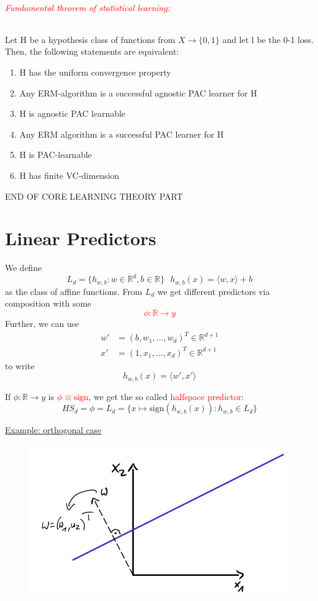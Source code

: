 \documentclass[10pt,a4paper]{article}
\theoremstyle{definition}
\theoremstyle{plain}
\begin{document}
\paragraph{\textcolor{red}{Fundamental theorem of statistical learning:}}
Let H be a hypothesis class of functions from $X \to \{ 0,1 \}$ and let l be the 0-1 loss. Then, the following statements are equivalent:
\begin{enumerate}
	\item H has the uniform convergence property
	\item Any ERM-algorithm is a successful agnostic PAC learner for H
	\item H is agnostic PAC learnable
	\item Any ERM algorithm is a successful PAC learner for H
	\item H is PAC-learnable
	\item H has finite VC-dimension
\end{enumerate}

END OF CORE LEARNING THEORY PART

\newpage

\part{Linear Predictors}
We define 
$$
	L_d = \{ h_{w,b}: w \in \mathbb{R}^d, b \in \mathbb{R}\} \ \ \ h_{w,b}(x) = \langle w,x \rangle + b
$$
as the class of affine functions. From $L_d$ we get different predictors via composition with some 
\textcolor{red}{$$
	\mathcal{\phi}: \mathbb{R} \to y
$$}
Further, we can use
\begin{align*}
	w' &= (b, w_1, ... , w_d)^T \in \mathbb{R}^{d+1}\\
	x' &= (1, x_1, ... , x_d)^T \in \mathbb{R}^{d+1}
\end{align*}
to write 
$$
	h_{w,b} (x) = \langle w', x' \rangle
$$

If $\mathcal{\phi}: \mathbb{R} \to y$ is \textcolor{red}{$\mathcal{\phi} \equiv \text{sign}$}, we get the so called \textcolor{red}{halfspace predictor}:
$$
	HS_d = \mathcal{\phi} = L_d = \{ x \mapsto \text{sign}(h_{w,b}(x)): h_{w,b} \in L_d \}
$$

\underline{Example: orthogonal case}
\begin{figure}[H]
	\centering
	\includegraphics[width=0.7\linewidth]{sketch_7}
	\label{fig:sketch7}
\end{figure}
\end{document}
